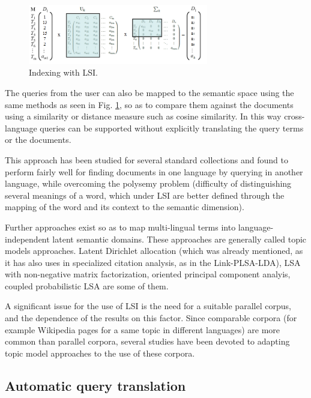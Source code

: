 \documentclass{llncs}
\begin{document}
\begin{figure}[h!]
  \centering
      \includegraphics[width=0.7\textwidth]{LSI.png}
  \caption{Indexing with LSI.}
\label{fig:IndexingLSI}
\end{figure}

The queries from the user can also be mapped to the semantic space using the same methods as seen in Fig. \ref{fig:IndexingLSI}, so as to compare them against the documents using a similarity or distance measure such as cosine similarity. In this way cross-language queries can be supported without explicitly translating the query terms or the documents.

This approach has been studied for several standard collections and found to perform fairly well for finding documents in one language by querying in another language, while overcoming the polysemy problem (difficulty of distinguishing several meanings of a word, which under LSI are better defined through the mapping of the word and its context to the semantic dimension)\cite{dumais1997automatic}. 

Further approaches exist so as to map multi-lingual terms into language-independent latent semantic domains. These approaches are generally called topic models approaches. Latent Dirichlet allocation (which was already mentioned, as it has also uses in specialized citation analysis, as in the Link-PLSA-LDA)\cite{vulic2013cross}, LSA with non-negative matrix factorization, oriented principal component analyis, coupled probabilistic LSA\cite{platt2010translingual} are some of them\cite{arora2012learning}. 

A significant issue for the use of LSI is the need for a suitable parallel corpus, and the dependence of the results on this factor. Since comparable corpora (for example Wikipedia pages for a same topic in different languages) are more common than parallel corpora, several studies have been devoted to adapting topic model approaches to the use of these corpora\cite{vulic2013cross}.

\subsection{Automatic query translation}
\end{document}
